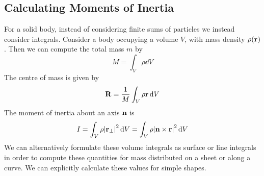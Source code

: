 \subsection{Calculating Moments of Inertia}
For a solid body, instead of considering finite sums of particles we instead consider integrals.
Consider a body occupying a volume \(V\), with mass density \(\rho(\vb r)\).
Then we can compute the total mass \(m\) by
\[
	M = \int_V \rho \dd{V}
\]
The centre of mass is given by
\[
	\vb R = \frac{1}{M} \int_V \rho \vb r \dd{V}
\]
The moment of inertia about an axis \(\vb n\) is
\[
	I = \int_V \rho \abs{\vb r_\perp}^2 \dd{V} = \int_V \rho \abs{\vb n \times \vb r}^2 \dd{V}
\]
We can alternatively formulate these volume integrals as surface or line integrals in order to compute these quantities for mass distributed on a sheet or along a curve.
We can explicitly calculate these values for simple shapes.
